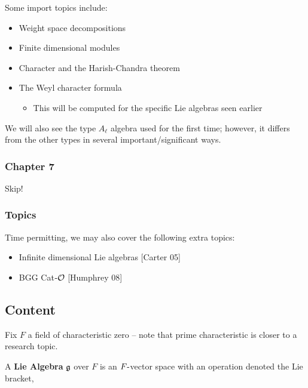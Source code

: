 Some import topics include:

\begin{itemize}
\tightlist
\item
  Weight space decompositions
\item
  Finite dimensional modules
\item
  Character and the Harish-Chandra theorem
\item
  The Weyl character formula

  \begin{itemize}
  \tightlist
  \item
    This will be computed for the specific Lie algebras seen earlier
  \end{itemize}
\end{itemize}

We will also see the type \(A_{\ell}\) algebra used for the first time;
however, it differs from the other types in several
important/significant ways.

\hypertarget{chapter-7}{%
\subsubsection{Chapter 7}\label{chapter-7}}

Skip!

\hypertarget{topics}{%
\subsubsection{Topics}\label{topics}}

Time permitting, we may also cover the following extra topics:

\begin{itemize}
\tightlist
\item
  Infinite dimensional Lie algebras {[}Carter 05{]}
\item
  BGG Cat\({\hbox{-}}\mathcal O\) {[}Humphrey 08{]}
\end{itemize}

\hypertarget{content}{%
\subsection{Content}\label{content}}

Fix \(F\) a field of characteristic zero -- note that prime
characteristic is closer to a research topic.


A \textbf{Lie Algebra} \({\mathfrak{g}}\) over \(F\) is an \(F{\hbox{-}}\)vector space
with an operation denoted the Lie bracket,

